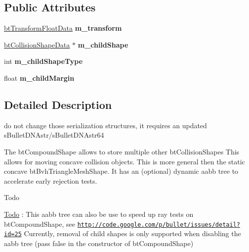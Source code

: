 \subsection*{Public Attributes}
\begin{DoxyCompactItemize}
\item 
\mbox{\label{structbtCompoundShapeChildData_aa4e204a234cb5fcc33904433d0f87d06}} 
\hyperlink{structbtTransformFloatData}{bt\+Transform\+Float\+Data} {\bfseries m\+\_\+transform}
\item 
\mbox{\label{structbtCompoundShapeChildData_a3c97807aec452fdc39a3f43bb00aa88c}} 
\hyperlink{structbtCollisionShapeData}{bt\+Collision\+Shape\+Data} $\ast$ {\bfseries m\+\_\+child\+Shape}
\item 
\mbox{\label{structbtCompoundShapeChildData_a870f5c357ff4c5e0da76d56755890af1}} 
int {\bfseries m\+\_\+child\+Shape\+Type}
\item 
\mbox{\label{structbtCompoundShapeChildData_a504e17125ac8eb1bca4d2168832eb463}} 
float {\bfseries m\+\_\+child\+Margin}
\end{DoxyCompactItemize}


\subsection{Detailed Description}
do not change those serialization structures, it requires an updated s\+Bullet\+D\+N\+Astr/s\+Bullet\+D\+N\+Astr64 

The bt\+Compound\+Shape allows to store multiple other bt\+Collision\+Shapes This allows for moving concave collision objects. This is more general then the static concave bt\+Bvh\+Triangle\+Mesh\+Shape. It has an (optional) dynamic aabb tree to accelerate early rejection tests. \begin{DoxyRefDesc}{Todo}
\item[\hyperlink{todo__todo000021}{Todo}]\+: This aabb tree can also be use to speed up ray tests on bt\+Compound\+Shape, see \href{http://code.google.com/p/bullet/issues/detail?id=25}{\tt http\+://code.\+google.\+com/p/bullet/issues/detail?id=25} Currently, removal of child shapes is only supported when disabling the aabb tree (pass \textquotesingle{}false\textquotesingle{} in the constructor of bt\+Compound\+Shape) \end{DoxyRefDesc}


